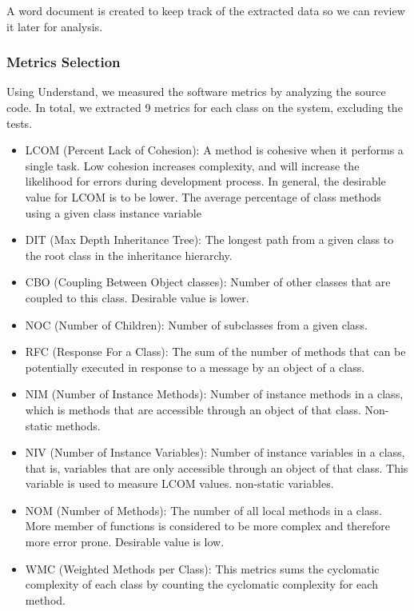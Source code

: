 A word document is created to keep track of the extracted data so we can review it later for analysis. 


\subsubsection{Metrics Selection}
Using Understand, we measured the software metrics by analyzing the source code. In total, we extracted 9 metrics for each class on the system, excluding the tests.

\begin{itemize}
	\item LCOM (Percent Lack of Cohesion): A method is cohesive when it performs a single task. Low cohesion increases complexity, and will increase the likelihood for errors during development process. In general, the desirable value for LCOM is to be lower. The average percentage of class methods using a given class instance variable

	\item DIT (Max Depth Inheritance Tree): The longest path from a given class to the root class in the inheritance hierarchy.

\item CBO (Coupling Between Object classes): Number of other classes that are coupled to this class. Desirable value is lower. 

\item NOC (Number of Children): Number of subclasses from a given class.

\item RFC (Response For a Class): The sum of the number of methods that can be potentially executed in response to a message by an object of a class.

\item NIM (Number of Instance Methods): Number of instance methods in a class, which is methods that are accessible through an object of that class. Non-static methods.

\item NIV (Number of Instance Variables): Number of instance variables in a class, that is, variables that are only accessible through an object of that class. This variable is used to measure LCOM values. non-static variables.

\item NOM (Number of Methods): The number of all local methods in a class. More member of functions is considered to be more complex and therefore more error prone. Desirable value is low.

\item WMC (Weighted Methods per Class): This metrics sums the cyclomatic complexity of each class by counting the cyclomatic complexity for each method.
\end{itemize}


